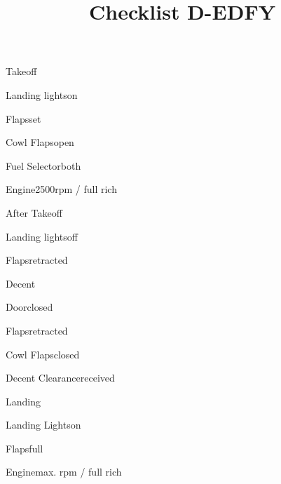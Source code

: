 \def\papersize{6}





\title{Checklist D-EDFY}

\begin{checklist}{Takeoff}
  \item{Landing lights}{on}
  \item{Flaps}{set}
  \item{Cowl Flaps}{open}
  \item{Fuel Selector}{both}
  \item{Engine}{2500rpm / full rich}
\end{checklist}

\begin{checklist}{After Takeoff}
  \item{Landing lights}{off}
  \item{Flaps}{retracted}
\end{checklist}

\begin{checklist}{Decent}
  \item{Door}{closed}
  \item{Flaps}{retracted}
  \item{Cowl Flaps}{closed}
  \item{Decent Clearance}{received}
\end{checklist}

\begin{checklist}{Landing}
  \item{Landing Lights}{on}
  \item{Flaps}{full}
  \item{Engine}{max. rpm / full rich}
\end{checklist}

